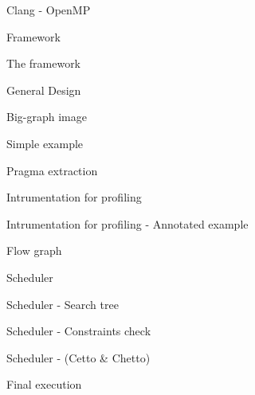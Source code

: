 \documentclass[xcolor=dvipsnames]{beamer}
\begin{document}
\begin{frame}{\hskip 0.3cm Clang - OpenMP}
\end{frame}

\begin{section}{Framework}
\begin{frame}{\hskip 0.3cm The framework}
\end{frame}

\begin{frame}{\hskip 0.3cm General Design}
\end{frame}

\begin{frame}{\hskip 0.3cm Big-graph image}
\end{frame}

\begin{frame}{\hskip 0.3cm Simple example}
\end{frame}

\begin{frame}{\hskip 0.3cm Pragma extraction}
\end{frame}

\begin{frame}{\hskip 0.3cm Intrumentation for profiling}
\end{frame}

\begin{frame}{\hskip 0.3cm Intrumentation for profiling - Annotated example}
\end{frame}

\begin{frame}{\hskip 0.3cm Flow graph}
\end{frame}

\begin{frame}{\hskip 0.3cm Scheduler}
\end{frame}

\begin{frame}{\hskip 0.3cm Scheduler - Search tree}
\end{frame}

\begin{frame}{\hskip 0.3cm Scheduler - Constraints check}
\end{frame}

\begin{frame}{\hskip 0.3cm Scheduler - (Cetto \& Chetto)}
\end{frame}

\begin{frame}{\hskip 0.3cm Final execution}
\end{frame}


\end{section}
\end{document}
